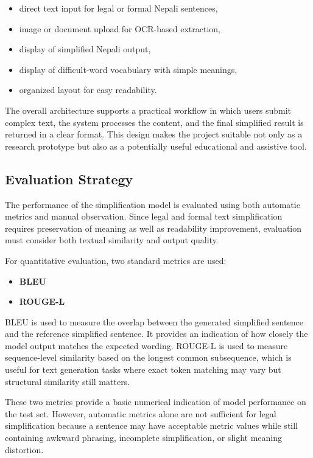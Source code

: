 \documentclass[12pt]{report}
\begin{document}
\begin{itemize}
    \item direct text input for legal or formal Nepali sentences,
    \item image or document upload for OCR-based extraction,
    \item display of simplified Nepali output,
    \item display of difficult-word vocabulary with simple meanings,
    \item organized layout for easy readability.
\end{itemize}

The overall architecture supports a practical workflow in which users submit complex text, the system processes the content, and the final simplified result is returned in a clear format. This design makes the project suitable not only as a research prototype but also as a potentially useful educational and assistive tool.

\subsection{Evaluation Strategy}

The performance of the simplification model is evaluated using both automatic metrics and manual observation. Since legal and formal text simplification requires preservation of meaning as well as readability improvement, evaluation must consider both textual similarity and output quality.

For quantitative evaluation, two standard metrics are used:

\begin{itemize}
    \item \textbf{BLEU}
    \item \textbf{ROUGE-L}
\end{itemize}

BLEU is used to measure the overlap between the generated simplified sentence and the reference simplified sentence. It provides an indication of how closely the model output matches the expected wording. ROUGE-L is used to measure sequence-level similarity based on the longest common subsequence, which is useful for text generation tasks where exact token matching may vary but structural similarity still matters.

These two metrics provide a basic numerical indication of model performance on the test set. However, automatic metrics alone are not sufficient for legal simplification because a sentence may have acceptable metric values while still containing awkward phrasing, incomplete simplification, or slight meaning distortion.
\end{document}
